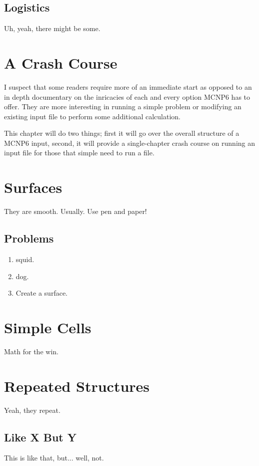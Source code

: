 \documentclass[10pt,a4paper]{book}
\begin{document}
\section{Logistics}

Uh, yeah, there might be some.

\chapter{A Crash Course}

I suspect that some readers require more of an immediate start as opposed to an in depth documentary on the inricacies of each and every option MCNP6 has to offer. They are more interesting in running a simple problem or modifying an existing input file to perform some additional calculation.

This chapter will do two things; first it will go over the overall structure of a MCNP6 input, second, it will provide a single-chapter crash course on running an input file for those that simple need to run a file.

\chapter{Surfaces}
They are smooth. Usually.
Use pen and paper!

\section*{Problems}

\begin{enumerate}
\item squid.

\item dog.

\item Create a surface.

\end{enumerate}

\chapter{Simple Cells}
Math for the win.

\chapter{Repeated Structures}
Yeah, they repeat.

\section{Like X But Y}
This is like that, but... well, not.
\end{document}
